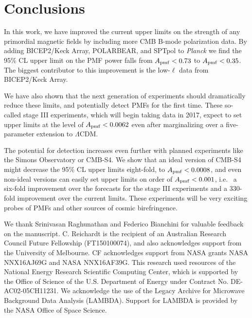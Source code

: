 \documentclass[apj]{emulateapj}
\newcommand{\apmf}{\ensuremath{A_{\rm pmf}}}
\newcommand{\lcdm}{\ensuremath{\Lambda}CDM}
\newcommand{\planck}{{\sl Planck}}
\newcommand{\bicepkeck}{BICEP2/Keck Array}
\newcommand{\pb}{POLARBEAR}
\newcommand{\sptpol}{SPTpol}
\begin{document}
\section{Conclusions}
\label{sec:conclusions}

In this work, we have improved the current upper limits on the strength of any primordial magnetic fields by including more CMB B-mode polarization data. 
By adding \bicepkeck{}, \pb, and \sptpol{} to \planck{} we find the 95\% CL upper limit on the PMF power falls from $\apmf < 0.73$ to $\apmf < 0.35$. 
The biggest contributor to this improvement is the low-$\ell$ data from \bicepkeck{}. 

We have also shown that the next generation of experiments should dramatically reduce these limits, and potentially detect PMFs for the first time. 
These so-called stage III experiments, which will begin taking data in 2017, expect to set upper limits at the level of $\apmf < 0.0062$ even after marginalizing over a five-parameter extension to \lcdm.

The potential for detection increases even further with planned experiments like the Simons Observatory or CMB-S4. 
We show that an ideal version of CMB-S4 might decrease the 95\% CL upper limits eight-fold, to $\apmf < 0.0008$, and even non-ideal versions can easily set upper limits on order of $\apmf < 0.001$, i.e.~ a six-fold improvement over the forecasts for the stage III experiments and a 330-fold improvement over the current limits. 
These experiments will be very exciting probes of PMFs and other sources of cosmic birefringence. 

\acknowledgments

We thank Srinivasan Raghunathan and Federico Bianchini for valuable feedback on the manuscript. 
C. Reichardt is the recipient of an Australian Research Council Future Fellowship (FT150100074), and also acknowledges support from the University of Melbourne. 
CF acknowledges support from NASA grants NASA NNX16AJ69G and NASA NNX16AF39G. 
This research used resources of the National Energy Research Scientific Computing Center, which is supported by the Office of Science of the U.S. Department of Energy under Contract No. DE-AC02-05CH11231. 
We acknowledge the use of the Legacy Archive for Microwave Background Data Analysis (LAMBDA). Support for LAMBDA is provided by the NASA Office of Space Science.



\end{document}
